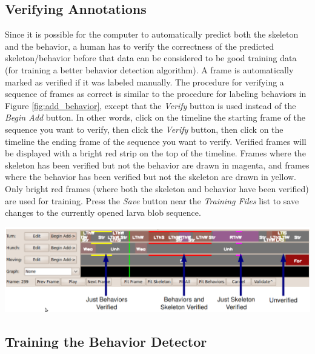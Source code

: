 \documentclass[10pt, onecolumn]{article}
\newcommand{\1}{\textbf{1}}
\begin{document}
\subsection{Verifying Annotations}
\label{sec:verify}

Since it is possible for the computer to automatically predict both the skeleton and the behavior, a human has to verify the correctness of the predicted skeleton/behavior before that data can be considered to be good training data (for training a better behavior detection algorithm).  A frame is automatically marked as verified if it was labeled manually.  The procedure for verifying a sequence of frames as correct is similar to the procedure for labeling behaviors in Figure \ref{fig:add_behavior}, except that the \textit{Verify} button is used instead of the \textit{Begin Add} button.  In other words, click on the timeline the starting frame of the sequence you want to verify, then click the \textit{Verify} button, then click on the timeline the ending frame of the sequence you want to verify.  Verified frames will be displayed with a bright red strip on the top of the timeline.  Frames where the skeleton has been verified but not the behavior are drawn in magenta, and frames where the behavior has been verified but not the skeleton are drawn in yellow.  Only bright red frames (where both the skeleton and behavior have been verified) are used for training.  Press the \textit{Save} button near the \textit{Training Files} list to save changes to the currently opened larva blob sequence.

\hspace{-.8cm}
\includegraphics[width=17cm]{Verify.png}

\subsection{Training the Behavior Detector}
\label{sec:train}
\end{document}
